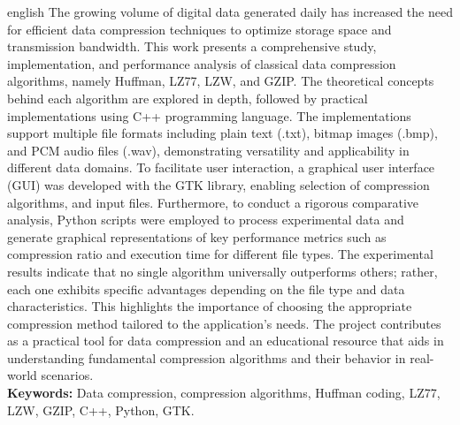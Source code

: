 \documentclass[
	12pt,				%
	openright,			%
	oneside,			%
	a4paper,			%
	english,			%
	french,				%
	spanish,			%
	brazil,				%
	]{lib/abntex2}
\newcommand{\listofquadrosname}{Lista de quadros}
\begin{document}
\begin{resumo}[Abstract]
	\begin{otherlanguage*}{english}
	    The growing volume of digital data generated daily has increased the need for efficient data compression techniques to optimize storage space and transmission bandwidth. This work presents a comprehensive study, implementation, and performance analysis of classical data compression algorithms, namely Huffman, LZ77, LZW, and GZIP. The theoretical concepts behind each algorithm are explored in depth, followed by practical implementations using C++ programming language. The implementations support multiple file formats including plain text (.txt), bitmap images (.bmp), and PCM audio files (.wav), demonstrating versatility and applicability in different data domains.
To facilitate user interaction, a graphical user interface (GUI) was developed with the GTK library, enabling selection of compression algorithms, and input files. Furthermore, to conduct a rigorous comparative analysis, Python scripts were employed to process experimental data and generate graphical representations of key performance metrics such as compression ratio and execution time for different file types.
The experimental results indicate that no single algorithm universally outperforms others; rather, each one exhibits
specific advantages depending on the file type and data characteristics. This highlights the importance of choosing the
appropriate compression method tailored to the application's needs. The project contributes as a practical tool for data compression and an educational resource that aids in understanding fundamental compression algorithms and their behavior in real-world scenarios.\\
		\textbf{Keywords:} Data compression, compression algorithms, Huffman coding, LZ77, LZW, GZIP, C++, Python, GTK.
	\end{otherlanguage*}
\end{resumo}



\listoffigures*
\cleardoublepage

\end{document}
